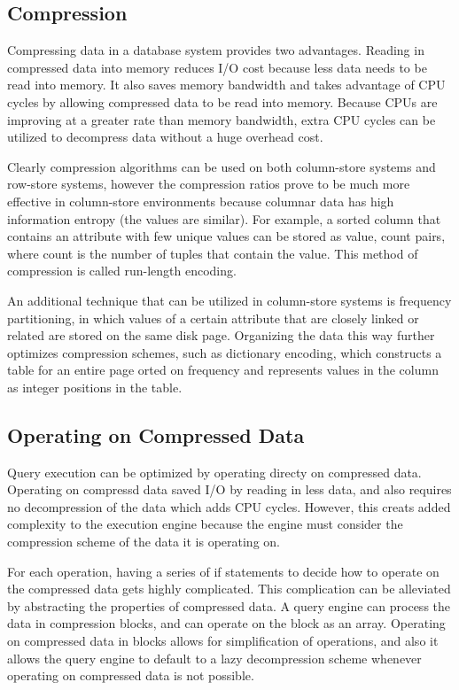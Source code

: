 


\subsection*{Compression}



Compressing data in a database system provides two advantages. Reading in compressed data into memory reduces I/O cost because less data needs to be read into memory. It also saves memory bandwidth and takes advantage of CPU cycles by allowing compressed data to be read into memory. Because CPUs are improving at a greater rate than memory bandwidth, extra CPU cycles can be utilized to decompress data without a huge overhead cost\cite{now}.


Clearly compression algorithms can be used on both column-store systems and row-store systems, however the compression ratios prove to be much more effective in column-store environments because columnar data has high information entropy (the values are similar)\cite{colvsrow}. For example, a sorted column that contains an attribute with few unique values can be stored as {value, count} pairs, where count is the number of tuples that contain the value. This method of compression is called run-length encoding\cite{now}. 


An additional technique that can be utilized in column-store systems is frequency partitioning, in which values of a certain attribute that are closely linked or related are stored on the same disk page. Organizing the data this way further optimizes compression schemes, such as dictionary encoding, which constructs a table for an entire page orted on frequency and represents values in the column as integer positions in the table\cite{now}. 


\subsection*{Operating on Compressed Data}


Query execution can be optimized by operating directy on compressed data. Operating on compressd data saved I/O by reading in less data, and also requires no decompression of the data which adds CPU cycles. However, this creats added complexity to the execution engine because the engine must consider the compression scheme of the data it is operating on. 


For each operation, having a series of if statements to decide how to operate on the compressed data gets highly complicated. This complication can be alleviated by abstracting the properties of compressed data. A query engine can process the data in compression blocks, and can operate on the block as an array\cite{compression}. Operating on compressed data in blocks allows for simplification of operations, and also it allows the query engine to default to a lazy decompression scheme whenever operating on compressed data is not possible.